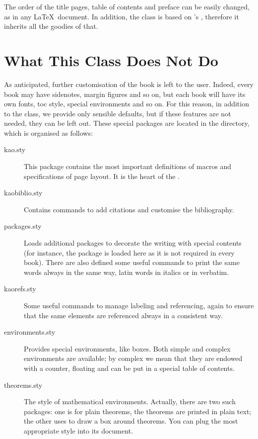 The order of the title pages, table of contents and preface can be 
easily changed, as in any \LaTeX\ document. In addition, the class is 
based on \KOMAScript's , therefore it inherits all the 
goodies of that.

\section{What This Class Does Not Do}

As anticipated, further customisation of the book is left to the user. 
Indeed, every book may have sidenotes, margin figures and so on, but 
each book will have its own fonts, toc style, special environments and 
so on. For this reason, in addition to the class, we provide only 
sensible defaults, but if these features are not needed, they can be 
left out. These special packages are located in the  
directory, which is organised as follows:

\begin{description}
	\item[kao.sty] This package contains the most important definitions 
	of macros and specifications of page layout. It is the heart of the 
	.
	\item[kaobiblio.sty] Contains commands to add citations and 
	customise the bibliography.
	\item[packages.sty] Loads additional packages to decorate the 
	writing with special contents (for instance, the  
	package is loaded here as it is not required in every book). There 
	are also defined some useful commands to print the same words always 
	in the same way, \eg latin words in italics or  in 
	verbatim.
	\item[kaorefs.sty] Some useful commands to manage labeling and 
	referencing, again to ensure that the same elements are referenced 
	always in a consistent way.
	\item[environments.sty] Provides special environments, like boxes. 
	Both simple and complex environments are available; by complex we 
	mean that they are endowed with a counter, floating and can be put 
	in a special table of contents.
	\item[theorems.sty] The style of mathematical environments. 
	Actually, there are two such packages: one is for plain theorems,
	\ie the theorems are printed in plain text; the other uses 
	 to draw a box around theorems. You can plug the 
	most appropriate style into its document.
\end{description}

